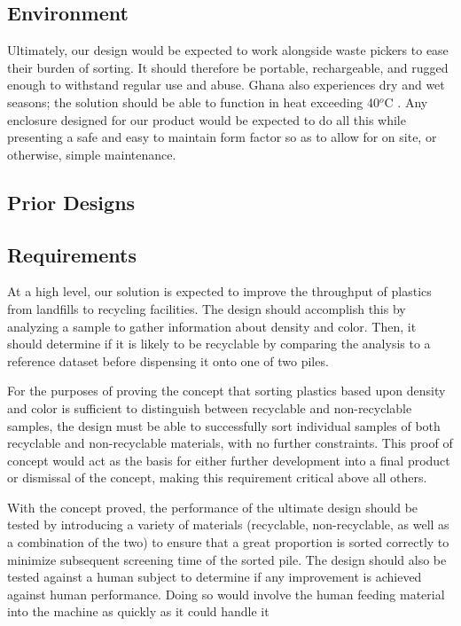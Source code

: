 \documentclass[12pt]{article}
\begin{document}
\begin{multicols*}{2}
        \subsection{Environment}
            Ultimately, our design would be expected to work alongside waste pickers to ease their burden of sorting. It should therefore be portable, rechargeable, and rugged enough to withstand regular use and abuse. Ghana also experiences dry and wet seasons; the solution should be able to function in heat exceeding 40$^o$C \cite{GMET}. Any enclosure designed for our product would be expected to do all this while presenting a safe and easy to maintain form factor so as to allow for on site, or otherwise, simple maintenance. 

        \subsection{Prior Designs}

        \subsection{Requirements}
            At a high level, our solution is expected to improve the throughput of plastics from landfills to recycling facilities. The design should accomplish this by analyzing a sample to gather information about density and color. Then, it should determine if it is likely to be recyclable by comparing the analysis to a reference dataset before dispensing it onto one of two piles. 

            For the purposes of proving the concept that sorting plastics based upon density and color is sufficient to distinguish between recyclable and non-recyclable samples, the design must be able to successfully sort individual samples of both recyclable and non-recyclable materials, with no further constraints. This proof of concept would act as the basis for either further development into a final product or dismissal of the concept, making this requirement critical above all others.

            With the concept proved, the performance of the ultimate design should be tested by introducing a variety of materials (recyclable, non-recyclable, as well as a combination of the two) to ensure that a great proportion is sorted correctly to minimize subsequent screening time of the sorted pile. The design should also be tested against a human subject to determine if any improvement is achieved against human performance. Doing so would involve the human feeding material into the machine as quickly as it could handle it 


\end{multicols*}
\end{document}
